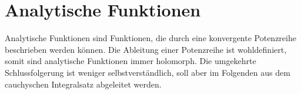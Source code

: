 %
%
%
\chapter{Analytische Funktionen
\label{chapter:analytisch}}
Analytische Funktionen sind Funktionen, die durch eine konvergente
Potenzreihe beschrieben werden können.
Die Ableitung einer Potenzreihe ist wohldefiniert, somit sind
analytische Funktionen immer holomorph.
Die umgekehrte Schlussfolgerung ist weniger selbstverständlich,
soll aber im Folgenden aus dem cauchyschen Integralsatz abgeleitet werden.







\uebungsabschnitt

\begin{uebungsaufgaben}
\end{uebungsaufgaben}
\enduebungsabschnitt

